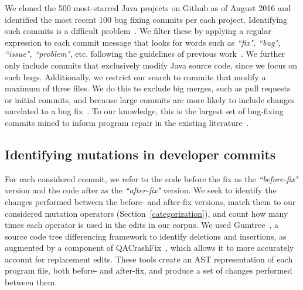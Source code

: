 \documentclass[conference]{IEEEtran}
\begin{document}
We cloned the 500 most-starred Java projects on Github 
as of August 2016 and
identified the most recent 100 bug fixing commits per each project. Identifying
such commits is a difficult
problem~\cite{Bird09}. We filter these by applying a
regular expression to each commit message that looks for words such as \emph{``fix", ``bug", ``issue", ``problem",}
etc. following the guidelines of previous work~\cite{schroter06}.
%
We further only include commits
that exclusively 
modify Java source code, since we focus on such bugs. Additionally, we restrict our search to commits 
that modify a maximum of three files. We do this to exclude
big merges, such as pull requests or initial commits, and because
large commits are more likely to include changes unrelated to a bug fix~\cite{Herzig13,Kawrykow11}.
To our knowledge, this is the largest set of bug-fixing commits mined to inform
program repair in the existing literature~\cite{long16proph,Soto16,zhong15,martinez15,xuan16}. 

\subsection{Identifying mutations in developer commits}
\label{sec:mining}

For each considered commit, we refer to the code before the fix as the
\emph{``before-fix"} version and the code after as the \emph{``after-fix"} version.
We seek to identify the changes performed between the before- and
after-fix versions, match them to our considered mutation operators
(Section~\ref{categorization}), and count how many times each operator is used
in the edits in our corpus. 
We used Gumtree~\cite{falleri14}, a source code tree
differencing framework to identify deletions and insertions, as augmented by a
component of QACrashFix~\cite{gao15}, which allows it to more accurately account for
replacement edits. 
These tools create an AST representation of each program file, both before- and after-fix, and produce a set of 
changes performed between them. 
\end{document}
